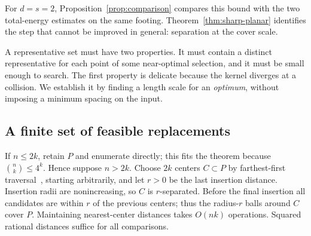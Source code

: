\documentclass[a4paper,12pt]{article}
\numberwithin{equation}{section}
\begin{document}
For $d=s=2$, Proposition~\ref{prop:comparison} compares this bound with the two total-energy
estimates on the same footing. Theorem~\ref{thm:sharp-planar} identifies the step that cannot
be improved in general: separation at the cover scale.

A representative set must have two properties. It must contain a distinct
representative for each point of some near-optimal selection, and it must be
small enough to search. The first property is delicate because the kernel
diverges at a collision. We establish it by finding a length scale for an
\emph{optimum}, without imposing a minimum spacing on the input.

\subsection{A finite set of feasible replacements}
If $n\le2k$, retain $P$ and enumerate directly; this fits the theorem because $\binom nk\le4^k$.
Hence suppose $n>2k$. Choose $2k$ centers $C\subset P$ by farthest-first
traversal~\cite{gonzalez1985}, starting arbitrarily, and let $r>0$ be the last insertion distance.
Insertion radii are nonincreasing, so $C$ is $r$-separated. Before the final insertion all
candidates are within $r$ of the previous centers; thus the radius-$r$ balls around $C$ cover $P$.
Maintaining nearest-center distances takes $O(nk)$ operations. Squared rational distances suffice
for all comparisons.
\end{document}
